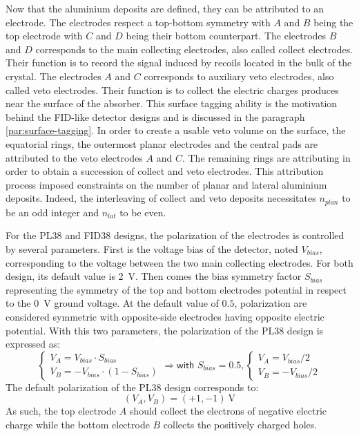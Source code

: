 Now that the aluminium deposits are defined, they can be attributed to an electrode. The electrodes respect a top-bottom symmetry with $A$ and $B$ being the top electrode with $C$ and $D$ being their bottom counterpart. The electrodes $B$ and $D$ corresponds to the main collecting electrodes, also called collect electrodes. Their function is to record the signal induced by recoils located in the bulk of the crystal. The electrodes $A$ and $C$ corresponds to auxiliary veto electrodes, also called veto electrodes. Their function is to collect the electric charges produces near the surface of the absorber. This surface tagging ability is the motivation behind the FID-like detector designs and is discussed in the paragraph \ref{par:surface-tagging}. In order to create a usable veto volume on the surface, the equatorial rings, the outermost planar electrodes and the central pads are attributed to the veto electrodes $A$ and $C$. The remaining rings are attributing in order to obtain a succession of collect and veto electrodes. This attribution process imposed constraints on the number of planar and lateral aluminium deposits. Indeed, the interleaving of collect and veto deposits necessitates $n_{plan}$ to be an odd integer and $n_{lat}$ to be even.

For the PL38 and FID38 designs, the polarization of the electrodes is controlled by several parameters. First is the voltage bias of the detector, noted $V_{bias}$, corresponding to the voltage between the two main collecting electrodes. For both design, its default value is \SI{2}{\volt}. Then comes the bias symmetry factor $S_{bias}$ representing the symmetry of the top and bottom electrodes potential in respect to the \SI{0}{\volt} ground voltage. At the default value of $0.5$, polarization are considered symmetric with opposite-side electrodes having opposite electric potential.
With this two parameters, the polarization of the PL38 design is expressed as:
\begin{equation}
\label{eq:fid-polarization}
\begin{cases}
\displaystyle
V_A = V_{bias} \cdot S_{bias}
\\
\displaystyle
V_B = - V_{bias} \cdot (1 - S_{bias})
\end{cases}
\Rightarrow
\textsf{with } S_{bias} = 0.5,
\begin{cases}
\displaystyle
V_A = V_{bias} / 2
\\
\displaystyle
V_B = - V_{bias} / 2 
\end{cases}
\end{equation}
The default polarization of the PL38 design corresponds to:
\begin{equation}
\left( V_A, V_B \right) = (+1, -1) \ \si{\volt}
\end{equation}
As such, the top electrode $A$ should collect the electrons of negative electric charge while the bottom electrode $B$ collects the positively charged holes.


